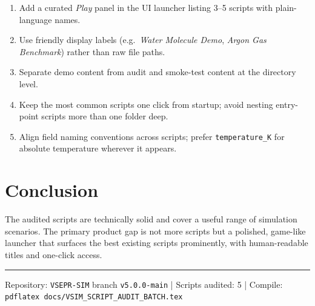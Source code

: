 \documentclass[10pt,a4paper]{article}
\begin{document}
\begin{enumerate}
  \item Add a curated \emph{Play} panel in the UI launcher listing 3--5 scripts
		with plain-language names.
  \item Use friendly display labels (e.g.\ \emph{Water Molecule Demo},
		\emph{Argon Gas Benchmark}) rather than raw file paths.
  \item Separate demo content from audit and smoke-test content at the
		directory level.
  \item Keep the most common scripts one click from startup; avoid nesting
		entry-point scripts more than one folder deep.
  \item Align field naming conventions across scripts; prefer \texttt{temperature\_K}
		for absolute temperature wherever it appears.
\end{enumerate}

\section*{Conclusion}

The audited scripts are technically solid and cover a useful range of
simulation scenarios. The primary product gap is not more scripts but a
polished, game-like launcher that surfaces the best existing scripts
prominently, with human-readable titles and one-click access.

\vspace{0.5em}\hrule\vspace{0.3em}
{\footnotesize
  Repository: \texttt{VSEPR-SIM} branch \texttt{v5.0.0-main} \quad|
  Scripts audited: 5 \quad|
  Compile: \texttt{pdflatex docs/VSIM\_SCRIPT\_AUDIT\_BATCH.tex}
}
\end{document}
